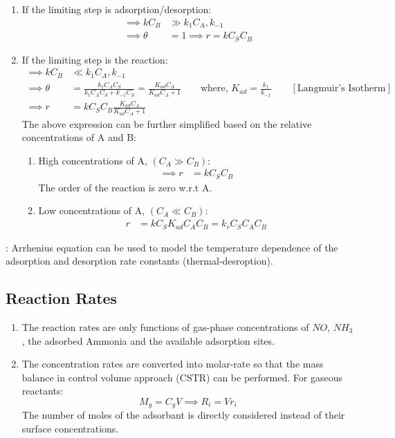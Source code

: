 \begin{enumerate}
    \item If the limiting step is adsorption/desorption:
    \begin{align*}
        \implies k C_B &\gg k_1 C_A, k_{-1}\\
        \implies \theta &= 1 \implies r = k C_S C_B
    \end{align*}

    \item If the limiting step is the reaction:
    \begin{align*}
        \implies k C_B &\ll k_1 C_A, k_{-1}\\
        \implies \theta &= \frac{k_1 C_A C_S}{k_1 C_A C_S + k_{-1}C_S}
                        = \frac{K_{ad} C_A}{K_{ad}C_A + 1} \qquad
        \text{where, } K_{ad} = \frac{k_1}{k_{-1}} \qquad
        [\text{Langmuir's Isotherm}]\\
        \implies r &= k C_S C_B \frac{K_{ad} C_A}{K_{ad}C_A + 1}
    \end{align*}
The above expression can be further simplified based on the relative
concentrations of A and B:
\begin{enumerate}
    \item High concentrations of A, $(C_A \gg C_B)$:
    \begin{align*}
        \implies r &= k C_S C_B
    \end{align*}
    The order of the reaction is zero w.r.t A.
    \item Low concentrations of A, $(C_A \ll C_B)$:
    \begin{align*}
        r &= k C_S K_{ad} C_A C_B = k_r C_S C_A C_B
    \end{align*}
\end{enumerate}
\end{enumerate}

: Arrhenius equation can be used to model the temperature dependence
of the adsorption and desorption rate constants (thermal-desroption).


\subsection{Reaction Rates}
\begin{enumerate}
\item The reaction rates are only functions of gas-phase concentrations of $NO$,
$NH_3$, the adsorbed Ammonia and the available adsorption sites.

\item The concentration rates are converted into molar-rate so that the
mass balance in control volume approach (CSTR) can be performed. For gaseous reactants:
$$ M_g = C_g V \implies R_i = V r_i $$
The number of moles of the adsorbant is directly considered instead of their
surface concentrations.
\end{enumerate}

